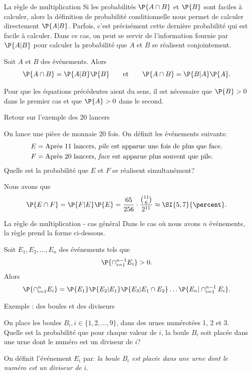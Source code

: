 \documentclass[nuit,charter,pied]{BeamerJS}
\begin{document}
\begin{frame}{La règle de multiplication}
\pause
	Si les probabilités $\P{A\cap B}$ et $\P{B}$ sont faciles à calculer, alors la définition de probabilité conditionnelle nous permet de calculer directement $\P{A|B}$. Parfois, c'est précisément cette dernière probabilité qui est facile à calculer. Dans ce cas, on peut se servir de l'information fournie par $\P{A|B}$ pour calculer la probabilité que $A$ et $B$ se réalisent conjointement.
	\pause
	\begin{thm}{}
		Soit $A$ et $B$ des événements. Alors
		\[\P{A\cap B}=\P{A|B}\P{B}\qquad\text{et}\qquad\P{A\cap B}=\P{B|A}\P{A}.\]
	\end{thm}
	\pause
	\begin{lumiere}
	Pour que les équations précédentes aient du sens, il est nécessaire que $\P{B}>0$ dans le premier cas et que $\P{A}>0$ dans le second.
	\end{lumiere}
\end{frame}
\begin{frame}{Retour sur l'exemple des 20 lancers}
\pause
	\begin{ex}
		On lance une pièce de monnaie 20 fois. On définit les événements suivants:
		\begin{align*}
			E&=\text{Après 11 lancers, \textit{pile} est apparue une fois de plus que face.}\\
			F&=\text{Après 20 lancers, \textit{face} est apparue plus souvent que pile.}
		\end{align*}
		Quelle est la probabilité que \(E\) et \(F\) se réalisent simultanément?
	\end{ex}
	\pause
    Nous avons que \[\P{E\cap F}=\P{F|E}\P{E}=\frac{65}{256}\cdot\frac{\binom{11}{6}}{2^{11}}\approx\SI{5,7}{\percent}.\]
\end{frame}
\begin{frame}{La règle de multiplication - cas général}
	Dans le cas où nous avons $n$ événements, la règle prend la forme ci-dessous.
	\pause
	\begin{thm}
		Soit $E_1,E_2,\ldots, E_n$ des événements tels que \[\P{\cap_{i=1}^{n-1}E_i}>0.\]
		Alors
		\[\P{\cap_{i=1}^{n}E_i}=\P{E_1}\P{E_2|E_1}\P{E_3|E_1\cap E_2}\ldots\P{E_n|\cap_{i=1}^{n-1} E_i}.\]
	\end{thm}
\end{frame}
\begin{frame}{Exemple : des boules et des diviseurs}
\pause
	\begin{ex}
	On place les boules $B_i, i\in\{1,2,\ldots,9\}$, dans des urnes numérotées 1, 2 et 3. Quelle est la probabilité que pour chaque valeur de \(i\), la boule \(B_i\) soit placée dans une urne dont le numéro est un diviseur de \(i\)?
\end{ex}
\pause
	On définit l'événement \(E_i\) par: \textit{la boule \(B_i\) est placée dans une urne dont le numéro est un diviseur de \(i\)}.
	
\end{frame}
\end{document}
